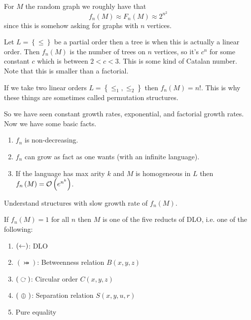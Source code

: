 \documentclass{amsart}
\begin{document}
\begin{exm}
For $M$ the random graph we roughly have that 
\begin{equation}
f_n\left(M\right)\approx F_n\left(M\right) \approx 2^{n^2} 
\end{equation}
since this is somehow asking for graphs with $n$ vertices.
\end{exm}

\begin{exm}
Let $L = \left\{\leq\right\}$ be a partial order then a tree is when this is actually a
linear order. Then
$f_n\left(M\right)$ is the number of trees on $n$ vertices, so it's $c^n$ for some
constant $c$ which is between $2 < c < 3$. This is some kind of Catalan number. 
Note that this is smaller than a factorial. 

If we take two linear orders $L = \left\{\leq_1 , \leq_2\right\}$ then 
$f_n\left(M\right) = n!$.
This is why these things are sometimes called permutation structures.
\end{exm}

So we have seen constant growth rates, exponential, and factorial growth rates. 
Now we have some basic facts. 

\begin{fact}[Cameron]
\begin{enumerate}[label = (\iii)]
\item $f_n$ is non-decreasing.
\item $f_n$ can grow as fact as one wants (with an infinite language).
\item If the language has max arity $k$ and $M$ is homogeneous in $L$ then
$f_n\left(M\right) = \mathcal{O}\left(e^{n^k}\right)$.
\end{enumerate}
\end{fact}

\begin{qn}
Understand structures with slow growth rate of $f_n\left(M\right)$.
\end{qn}

\begin{fact}[Cameron]
If $f_n\left(M\right) = 1$ for all $n$ then $M$ is one of the five reducts
of DLO, i.e. one of the following:
\begin{enumerate}[label = (\iii)]
\item $\left(\leftarrow\right)$: DLO
\item $\left(\bij\right)$: Betweenness relation $B\left(x,y,z\right)$
\item $\left(\acts\right)$: Circular order $C\left(x,y,z\right)$
\item $\left(\ \oplus\ \right)$: Separation relation $S\left(x,y,u,r\right)$
\item Pure equality
\end{enumerate}
\end{fact}
\end{document}
